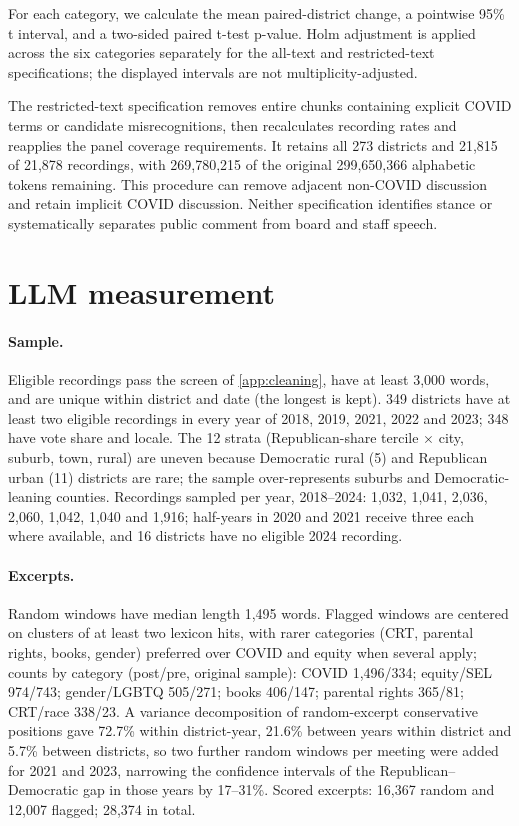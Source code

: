 For each category, we calculate the mean paired-district
change, a pointwise 95\% t interval, and a two-sided paired
t-test p-value. Holm adjustment is applied across the six
categories separately for the all-text and restricted-text
specifications; the displayed intervals are not
multiplicity-adjusted.

The restricted-text specification removes entire chunks
containing explicit COVID terms or candidate misrecognitions,
then recalculates recording rates and reapplies the panel
coverage requirements. It retains all 273 districts and
21,815 of 21,878 recordings, with 269,780,215 of the original
299,650,366 alphabetic tokens remaining. This procedure can
remove adjacent non-COVID discussion and retain implicit
COVID discussion. Neither specification identifies stance
or systematically separates public comment from board
and staff speech.

\section{LLM measurement}\label{app:llm}


\paragraph{Sample.}
Eligible recordings pass the screen of \cref{app:cleaning}, have at least 3,000 words, and are unique within district and date (the longest is kept). 349 districts have at least two eligible recordings in every year of 2018, 2019, 2021, 2022 and 2023; 348 have vote share and locale. The 12 strata (Republican-share tercile $\times$ city, suburb, town, rural) are uneven because Democratic rural (5) and Republican urban (11) districts are rare; the sample over-represents suburbs and Democratic-leaning counties. Recordings sampled per year, 2018--2024: 1,032, 1,041, 2,036, 2,060, 1,042, 1,040 and 1,916; half-years in 2020 and 2021 receive three each where available, and 16 districts have no eligible 2024 recording.

\paragraph{Excerpts.}
Random windows have median length 1,495 words. Flagged windows are centered on clusters of at least two lexicon hits, with rarer categories (CRT, parental rights, books, gender) preferred over COVID and equity when several apply; counts by category (post/pre, original sample): COVID 1,496/334; equity/SEL 974/743; gender/LGBTQ 505/271; books 406/147; parental rights 365/81; CRT/race 338/23. A variance decomposition of random-excerpt conservative positions gave 72.7\% within district-year, 21.6\% between years within district and 5.7\% between districts, so two further random windows per meeting were added for 2021 and 2023, narrowing the confidence intervals of the Republican--Democratic gap in those years by 17--31\%. Scored excerpts: 16,367 random and 12,007 flagged; 28,374 in total.

